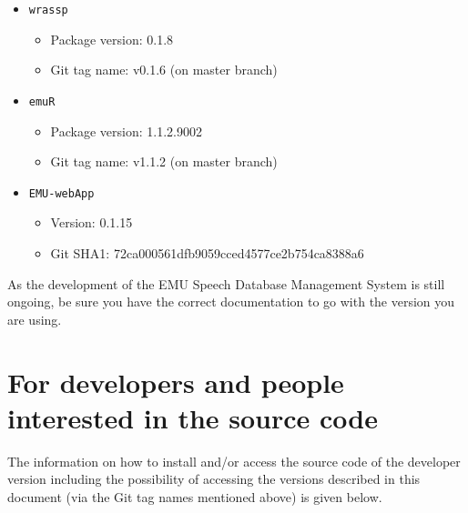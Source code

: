 \documentclass[]{book}
\providecommand{\tightlist}{%
  \setlength{\itemsep}{0pt}\setlength{\parskip}{0pt}}
\begin{document}
\begin{itemize}
\tightlist
\item
  \texttt{wrassp}

  \begin{itemize}
  \tightlist
  \item
    Package version: 0.1.8
  \item
    Git tag name: v0.1.6 (on master branch)
  \end{itemize}
\item
  \texttt{emuR}

  \begin{itemize}
  \tightlist
  \item
    Package version: 1.1.2.9002
  \item
    Git tag name: v1.1.2 (on master branch)
  \end{itemize}
\item
  \texttt{EMU-webApp}

  \begin{itemize}
  \tightlist
  \item
    Version: 0.1.15
  \item
    Git SHA1: 72ca000561dfb9059cced4577ce2b754ca8388a6
  \end{itemize}
\end{itemize}

As the development of the EMU Speech Database Management System is still ongoing, be sure you have the correct documentation to go with the version you are using.

\hypertarget{for-developers-and-people-interested-in-the-source-code}{%
\section{For developers and people interested in the source code}\label{for-developers-and-people-interested-in-the-source-code}}

The information on how to install and/or access the source code of the developer version including the possibility of accessing the versions described in this document (via the Git tag names mentioned above) is given below.
\end{document}
